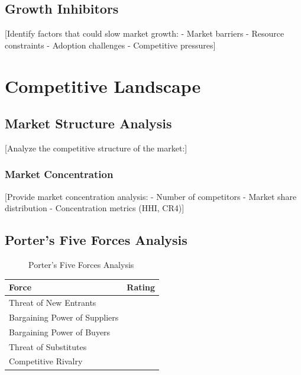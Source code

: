 \documentclass[11pt,letterpaper]{report}
\begin{document}
\section{Growth Inhibitors}

[Identify factors that could slow market growth:
- Market barriers
- Resource constraints
- Adoption challenges
- Competitive pressures]

\chapter{Competitive Landscape}

\section{Market Structure Analysis}

[Analyze the competitive structure of the market:]

\subsection{Market Concentration}

[Provide market concentration analysis:
- Number of competitors
- Market share distribution
- Concentration metrics (HHI, CR4)]

\section{Porter's Five Forces Analysis}


\begin{figure}[htbp]
\centering
\caption{Porter's Five Forces Analysis}
\label{fig:porter}
\end{figure}

\begin{porterbox}
\begin{tabular}{@{}ll@{}}
\textbf{Force} & \textbf{Rating} \\
\midrule
Threat of New Entrants & \riskmedium{} \\
Bargaining Power of Suppliers & \risklow{} \\
Bargaining Power of Buyers & \riskhigh{} \\
Threat of Substitutes & \risklow{} \\
Competitive Rivalry & \riskhigh{} \\
\end{tabular}
\end{porterbox}
\end{document}
